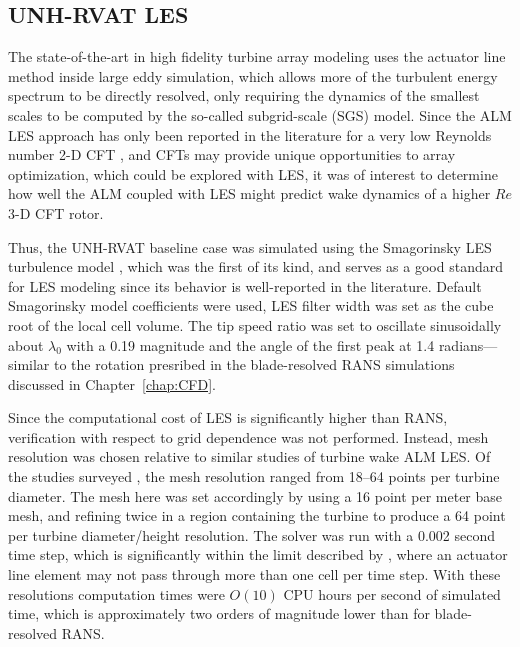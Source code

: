 \subsection{UNH-RVAT LES}

The state-of-the-art in high fidelity turbine array modeling uses the actuator
line method inside large eddy simulation, which allows more of the turbulent
energy spectrum to be directly resolved, only requiring the dynamics of the
smallest scales to be computed by the so-called subgrid-scale (SGS) model. Since
the ALM LES approach has only been reported in the literature for a very low
Reynolds number 2-D CFT \cite{Shamsoddin2014}, and CFTs may provide unique
opportunities to array optimization, which could be explored with LES, it was of
interest to determine how well the ALM coupled with LES might predict wake
dynamics of a higher $Re$ 3-D CFT rotor.

Thus, the UNH-RVAT baseline case was simulated using the Smagorinsky LES
turbulence model \cite{Smagorinsky1963}, which was the first of its kind, and
serves as a good standard for LES modeling since its behavior is well-reported
in the literature. Default Smagorinsky model coefficients were used, LES filter
width was set as the cube root of the local cell volume. The tip speed ratio was
set to oscillate sinusoidally about $\lambda_0$ with a 0.19 magnitude and the
angle of the first peak at 1.4 radians---similar to the rotation presribed in
the blade-resolved RANS simulations discussed in Chapter~\ref{chap:CFD}.

Since the computational cost of LES is significantly higher than RANS,
verification with respect to grid dependence was not performed. Instead, mesh
resolution was chosen relative to similar studies of turbine wake ALM LES. Of
the studies surveyed
\cite{Shamsoddin2014,Archer2013,Martinez-Tossas2015a,Troldborg2007}, the mesh
resolution ranged from 18--64 points per turbine diameter. The mesh here was set
accordingly by using a 16 point per meter base mesh, and refining twice in a
region containing the turbine to produce a 64 point per turbine diameter/height
resolution. The solver was run with a 0.002 second time step, which is
significantly within the limit described by \cite{Martinez-Tossas2015}, where an
actuator line element may not pass through more than one cell per time step.
With these resolutions computation times were $O(10)$ CPU hours per second of
simulated time, which is approximately two orders of magnitude lower than for
blade-resolved RANS.

